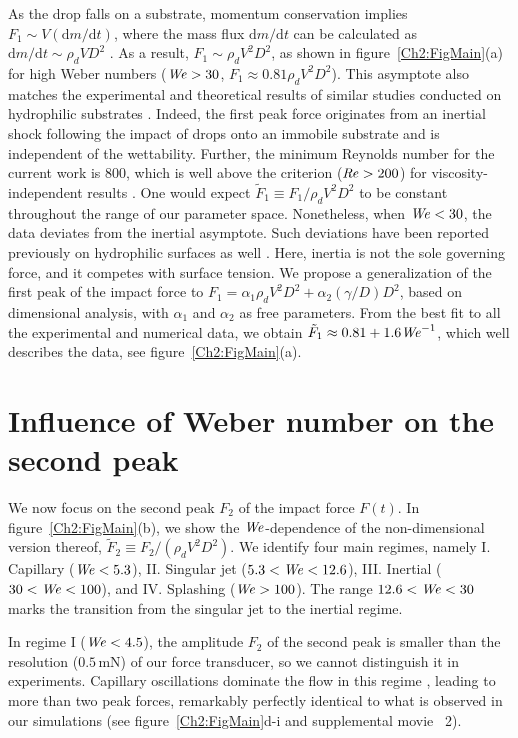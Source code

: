 As the drop falls on a substrate, momentum conservation implies $F_1 \sim V(\mathrm{d}m/\mathrm{d}t)$, where the mass flux $\mathrm{d}m/\mathrm{d}t$ can be calculated as $\mathrm{d}m/\mathrm{d}t \sim \rho_d VD^2$ \cite{soto2014}. As a result, $F_1 \sim \rho_d V^2D^2$, as shown in figure~\ref{Ch2:FigMain}(a) for high Weber numbers ($\mathit{We} > 30$, $F_1 \approx 0.81\rho_d V^2D^2$). This asymptote also matches the experimental and theoretical results of similar studies conducted on hydrophilic substrates \cite{zhang2017, Gordillo2018}. Indeed, the first peak force originates from an inertial shock following the impact of drops onto an immobile substrate and is independent of the wettability. Further, the minimum Reynolds number for the current work is $800$, which is well above the criterion ($\mathit{Re} > 200$) for viscosity-independent results \cite{zhang2017, Gordillo2018}. One would expect $\tilde{F}_1 \equiv F_1/\rho_d V^2D^2$ to be constant throughout the range of our parameter space. Nonetheless, when $\mathit{We} < 30$, the data deviates from the inertial asymptote. Such deviations have been reported previously on hydrophilic surfaces as well \cite{soto2014}. Here, inertia is not the sole governing force, and it competes with surface tension. We propose a generalization of the first peak of the impact force to $F_1 = \alpha_1\rho_d V^2 D^2 + \alpha_2(\gamma/ D) D^2$, based on dimensional analysis, with $\alpha_1$ and $\alpha_2$ as free parameters. From the best fit to all the experimental and numerical data, we obtain $\tilde{F}_1 \approx 0.81 + 1.6\mathit{We}^{-1}$, which well describes the data, see figure~\ref{Ch2:FigMain}(a).

\section{Influence of Weber number on the second peak}\label{Ch2:SecSecondPeak}

We now focus on the second peak $F_2$ of the impact force $F(t)$. In figure~\ref{Ch2:FigMain}(b), we show the $\mathit{We}$-dependence of the non-dimensional version thereof, $\tilde{F}_2 \equiv F_2/(\rho_d V^2 D^2)$. We identify four main regimes, namely I. Capillary ($\mathit{We} < 5.3$), II. Singular jet ($5.3 < \mathit{We} < 12.6$), III. Inertial ($30 < \mathit{We} < 100$), and IV. Splashing ($\mathit{We} > 100$). The range $12.6 < \mathit{We} < 30$ marks the transition from the singular jet to the inertial regime. 

In regime I ($\mathit{We} < 4.5$), the amplitude $F_2$ of the second peak is smaller than the resolution ($0.5\,\si{\milli\newton}$) of our force transducer, so we cannot distinguish it in experiments. Capillary oscillations dominate the flow in this regime \cite{richard2000bouncing}, leading to more than two peak forces, remarkably perfectly identical to what is observed in our simulations (see figure~\ref{Ch2:FigMain}d-i and supplemental movie~{\color{Myfig} 2}). 


